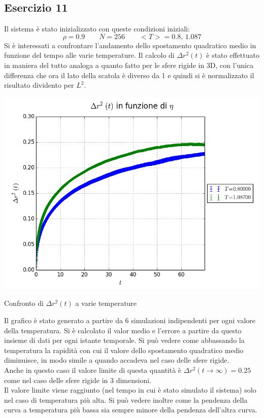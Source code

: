 \subsection{Esercizio 11}
Il sistema è stato inizializzato con queste condizioni iniziali:
$$
	\rho = 0.9 \qquad N=256 \qquad <T> = 0.8,\, 1.087
$$
Si è interessati a confrontare l'andamento dello spostamento quadratico medio in funzione del tempo alle varie temperature. Il calcolo di $\Delta r^2(t)$ è stato effettuato in maniera del tutto analoga a quanto fatto per le sfere rigide in 3D, con l'unica differenza che ora il lato della scatola è diverso da 1 e quindi si è normalizzato il risultato dividento per $L^2$.
\begin{myfig}[h]
\includegraphics[scale=0.6]{soft_core/11_dr2.png}
\caption{Confronto di $\Delta r^2(t)$ a varie temperature}
\end{myfig}
Il grafico è stato generato a partire da 6 simulazioni indipendenti per ogni valore della temperatura. Si è calcolato il valor medio e l'errore a partire da questo insieme di dati per ogni istante temporale.
Si può vedere come abbassando la temperatura la rapidità con cui il valore dello spostamento quadratico medio diminuisce, in modo simile a quando accadeva nel caso delle sfere rigide.\\
Anche in questo caso il valore limite di questa quantità è $\Delta r^2(t \rightarrow \infty) = 0.25$ come nel caso delle sfere rigide in 3 dimensioni.\\
Il valore limite viene raggiunto (nel tempo in cui è stato simulato il sistema) solo nel caso di temperatura più alta. Si può vedere inoltre come la pendenza della curva a temperatura più bassa sia sempre minore della pendenza dell'altra curva.

